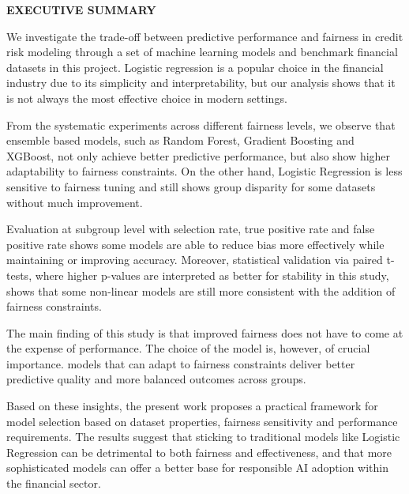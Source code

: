 \begin{center}
	\Large{\textbf{EXECUTIVE SUMMARY}}	
\end{center}
\vspace{1em}
\normalsize
\hspace{1cm} We investigate the trade-off between predictive performance and fairness in credit risk modeling through a set of machine learning models and benchmark financial datasets in this project. Logistic regression is a popular choice in the financial industry due to its simplicity and interpretability, but our analysis shows that it is not always the most effective choice in modern settings.

From the systematic experiments across different fairness levels, we observe that ensemble based models, such as Random Forest, Gradient Boosting and XGBoost, not only achieve better predictive performance, but also show higher adaptability to fairness constraints. On the other hand, Logistic Regression is less sensitive to fairness tuning and still shows group disparity for some datasets without much improvement.

Evaluation at subgroup level with selection rate, true positive rate and false positive rate shows some models are able to reduce bias more effectively while maintaining or improving accuracy. Moreover, statistical validation via paired t-tests, where higher p-values are interpreted as better for stability in this study, shows that some non-linear models are still more consistent with the addition of fairness constraints.

The main finding of this study is that improved fairness does not have to come at the expense of performance. The choice of the model is, however, of crucial importance. models that can adapt to fairness constraints deliver better predictive quality and more balanced outcomes across groups.

Based on these insights, the present work proposes a practical framework for model selection based on dataset properties, fairness sensitivity and performance requirements. The results suggest that sticking to traditional models like Logistic Regression can be detrimental to both fairness and effectiveness, and that more sophisticated models can offer a better base for responsible AI adoption within the financial sector.
